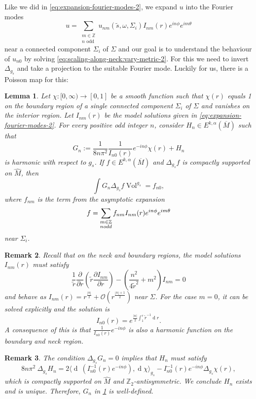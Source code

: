\documentclass[preprint,12pt]{elsarticle}
\numberwithin{table}{section}
\newtheorem{lemma}{Lemma}[section]
\newtheorem{remark}[lemma]{Remark}
\newcommand{\Z}{\mathbb{Z}}
\newcommand{\del}{\partial}
\newcommand{\Vol}{\operatorname{Vol}}
\renewcommand{\d}{\operatorname{d}\!}
\renewcommand{\O}{\mathcal{O}}
\begin{document}
Like we did in \cref{eq:expansion-fourier-modes-2}, we expand $u$ into the Fourier modes
$$
\label{eq:scaling-along-neck:expansion-fourier-modes}
u = \sum_{\substack{m \in \Z \\ n \text{ odd}}} u_{nm}(\tilde s, \omega, \Sigma_i) I_{nm}(r) e^{in \phi} e^{im \theta}
$$
near a connected component $\Sigma_i$ of $\Sigma$
and our goal is to understand the behaviour of $u_{n0}$ by solving \cref{eq:scaling-along-neck:vary-metric-2}. For this we need to invert $\Delta_{g_s}$ and take a projection to the suitable Fourier mode. Luckily for us, there is a Poisson map for this:
\begin{lemma}
	\label{lem:greens-like-function}
	Let $\chi \colon [0, \infty) \to [0,1]$ be a smooth function such that $\chi(r)$ equals 1 on the boundary region of a single connected component $\Sigma_i$ of $\Sigma$ and vanishes on the interior region. Let $I_{nm}(r)$ be the model solutions given in \cref{eq:expansion-fourier-modes-2}.
	For every positive odd integer $n$, consider $H_{n} \in E^{k, \alpha}(\overline M)$ such that
	$$
	G_n := \frac{1}{8 n \pi^2} \frac{1}{I_{n0}(r)} e^{- i n \phi} \chi(r) + H_n
	$$
	is harmonic with respect to $g_s$.
	If $f \in E^{k, \alpha}(\overline M)$ and $\Delta_{g_{s}}f$ is compactly supported on $\hat{M}$, then
	$$
	\int G_n \Delta_{g_s} f \Vol^{g_s} = f_{n0},
	$$
	where $f_{nm}$ is the term from the asymptotic expansion
	$$
	f = \sum_{\substack{m \in \Z \\ n \textnormal{ odd}}} f_{nm} I_{nm}(r) e^{in \phi} e^{im \theta}
	$$
	near $\Sigma_i$.
\end{lemma}
\begin{remark}
	\label{rem:extension-In0}
	Recall that on the neck and boundary regions, the model solutions $I_{nm}(r)$ must satisfy
	$$
	\frac{1}{\tilde{r}}
		\frac{\del}{\del r} \left(\tilde{r} \frac{\del I_{nm}}{\del r}\right)
		 - \left(\frac{n^2}{4 \tilde{r}^2} + m^2\right) I_{nm} = 0
	$$
	and behave as $I_{nm}(r) = r^{\frac{|n|}{2}} + \O(r^{\frac{|n|+1}{2}})$ near $\Sigma$. For the case $m = 0$, it can be solved explicitly and the solution is
	$$
	I_{n0}(r) = e^{\frac{|n|}{2} \int_{1}^r \tilde{r}^{-1} \d r}.
	$$
	A consequence of this is that $\frac{1}{I_{n0}(r)}e^{-in \phi}$ is also a harmonic function on the boundary and neck region.
\end{remark}
\begin{remark}
	\label{rem:behaviour-Hn}
	The condition $\Delta_{g_s} G_n = 0$ implies that $H_n$ must satisfy 
	$$
	8 n \pi^2 \: \Delta_{g_s} H_n 
	= 2\langle \d\: (I_{n0}^{-1}(r) e^{- i n \phi}),   \d \chi \rangle_{g_s}
	- I_{n0}^{-1}(r) e^{- i n \phi} \Delta_{g_s}
		\chi(r),
	$$
	which is compactly supported on $\hat{M}$ and $\Z_2$-antisymmetric. We conclude $H_n$ exists and is 
	unique. Therefore, $G_n$ in \cref{lem:greens-like-function} is well-defined.
\end{remark}
\end{document}
